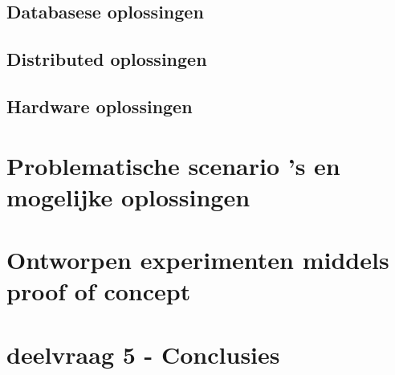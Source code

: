 \subsection{Databasese oplossingen}

\clearpage

\subsection{Distributed oplossingen}

\clearpage

\subsection{Hardware oplossingen}

\clearpage

\section{Problematische scenario 's en mogelijke oplossingen}
\label{sec:deelvraag3}

\clearpage


\section{Ontworpen experimenten middels proof of concept}
\label{sec:deelvraag4}

\clearpage

\section{deelvraag 5 - Conclusies}
\label{sec:deelvraag5}
